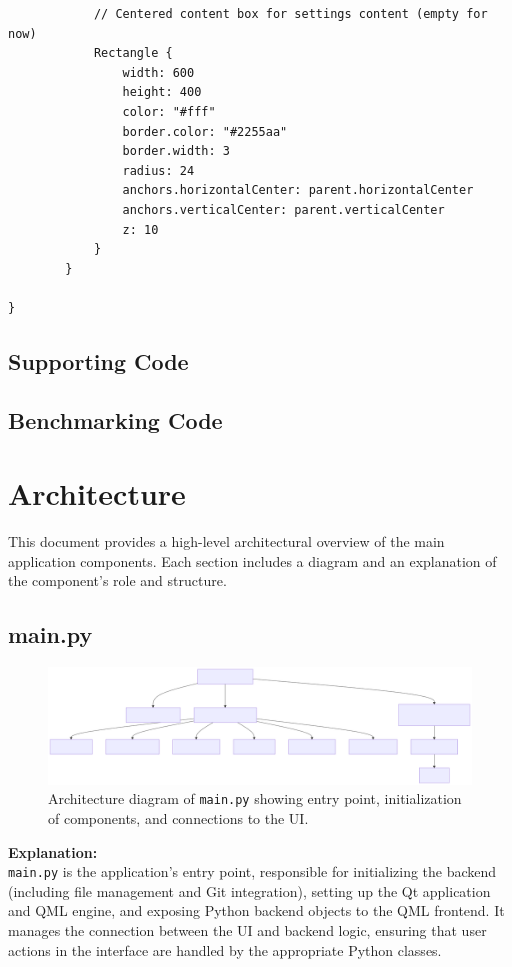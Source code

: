 \documentclass{report}
\begin{document}
\begin{lstlisting}
            // Centered content box for settings content (empty for now)
            Rectangle {
                width: 600
                height: 400
                color: "#fff"
                border.color: "#2255aa"
                border.width: 3
                radius: 24
                anchors.horizontalCenter: parent.horizontalCenter
                anchors.verticalCenter: parent.verticalCenter
                z: 10
            }
        }

}

\end{lstlisting}
\section{Supporting Code}
\section{Benchmarking Code}
\chapter{Architecture}
This document provides a high-level architectural overview of the main application components. Each section includes a diagram and an explanation of the component's role and structure.
\section{main.py}

\begin{figure}[ht]
\centering
\includegraphics[width=\textwidth]{png_files/main_py_architecture.png}
\caption{Architecture diagram of \texttt{main.py} showing entry point, initialization of components, and connections to the UI.}
\end{figure}

\noindent
\textbf{Explanation:} \\
\texttt{main.py} is the application's entry point, responsible for initializing the backend (including file management and Git integration), setting up the Qt application and QML engine, and exposing Python backend objects to the QML frontend. It manages the connection between the UI and backend logic, ensuring that user actions in the interface are handled by the appropriate Python classes.
\end{document}
